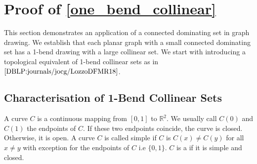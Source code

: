 \section{Proof of \cref{one_bend_collinear}}
\label{one_bend}
This section demonstrates an application of a connected dominating set in graph drawing. We establish that each planar graph with a small connected dominating set has a 1-bend drawing with a large collinear set. We start with introducing a topological equivalent of 1-bend collinear sets as in $\cite{DBLP:journals/jocg/LozzoDFMR18}$.





\subsection{Characterisation of 1-Bend Collinear Sets}
A curve $C$ is a continuous mapping from $[0, 1]$ to $\mathbb{R}^2$. We usually call $C(0)$ and $C(1)$ the endpoints of $C$. If these two endpoints coincide, the curve is closed. Otherwise, it is open. A curve $C$ is called simple if $C$ is $C(x) \neq C(y)$ for all $x \neq y$ with exception for the endpoints of $C$ i.e $\{0, 1\}$. $C$ is a  if it is simple and closed.

